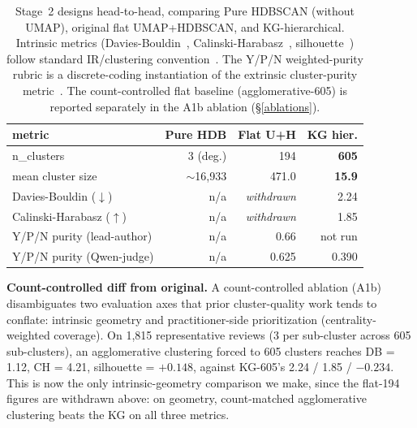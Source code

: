 \documentclass[preprint,12pt]{elsarticle}
\begin{document}
\begin{table}[!htbp]\centering\footnotesize
  \caption{Stage~2 designs head-to-head, comparing Pure HDBSCAN (without UMAP), original flat
  UMAP+HDBSCAN, and KG-hierarchical. Intrinsic metrics (Davies-Bouldin~\cite{davies1979cluster},
   Calinski-Harabasz~\cite{calinski1974dendrite}, silhouette~\cite{rousseeuw1987silhouettes})
  follow standard IR/clustering convention~\cite{schutze2008introduction,
  steinbach2000comparison, strehl2002cluster}. The Y/P/N weighted-purity rubric is a
  discrete-coding instantiation of the extrinsic cluster-purity
  metric~\cite{amigo2009comparison, schutze2008introduction}. The count-controlled flat baseline
   (agglomerative-605) is reported separately in the A1b ablation            
  (\S\ref{ablations}).}\label{tab:cluster-quality}
  \begin{tabular}{@{}p{3.4cm}rrr@{}}\toprule
  metric & Pure HDB & Flat U+H & \textbf{KG hier.} \\\midrule
  n\_clusters & 3 (deg.) & 194 & \textbf{605} \\
  mean cluster size & $\sim$16{,}933 & 471.0 & \textbf{15.9} \\
  Davies-Bouldin ($\downarrow$) & n/a & \emph{withdrawn} & 2.24 \\
  Calinski-Harabasz ($\uparrow$) & n/a & \emph{withdrawn} & 1.85 \\
  Y/P/N purity (lead-author) & n/a & 0.66 & not run \\
  Y/P/N purity (Qwen-judge) & n/a & 0.625 & 0.390 \\
  \bottomrule\end{tabular}\end{table}
  
\textbf{Count-controlled diff from original.} A count-controlled ablation (A1b) disambiguates
  two evaluation axes that prior cluster-quality work tends to conflate: intrinsic geometry and
  practitioner-side prioritization (centrality-weighted coverage). On 1{,}815 representative
  reviews (3 per sub-cluster across 605 sub-clusters), an agglomerative clustering forced to 605
   clusters reaches DB = 1.12, CH = 4.21, silhouette = $+0.148$, against KG-605's 2.24 / 1.85 /
  $-0.234$. This is now the only intrinsic-geometry comparison we make, since the flat-194 figures are
  withdrawn above: on geometry, count-matched agglomerative clustering beats the KG on all three
  metrics.
\end{document}
